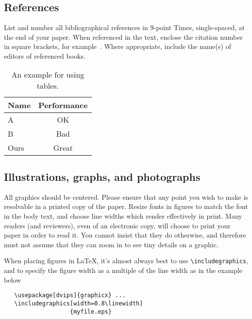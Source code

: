 \documentclass[10pt,twocolumn,letterpaper]{article}
\begin{document}
\subsection{References}

List and number all bibliographical references in 9-point Times,
single-spaced, at the end of your paper. When referenced in the text,
enclose the citation number in square brackets, for
example~\cite{Authors12}.  Where appropriate, include the name(s) of
editors of referenced books.

\begin{table}
\begin{center}
\begin{tabular}{|l|c|}
\hline
Name & Performance \\
\hline\hline
A & OK\\
B & Bad \\
Ours & Great\\
\hline
\end{tabular}
\end{center}
\caption{An example for using tables.}
\end{table}

\subsection{Illustrations, graphs, and photographs}

All graphics should be centered.  Please ensure that any point you wish to
make is resolvable in a printed copy of the paper.  Resize fonts in figures
to match the font in the body text, and choose line widths which render
effectively in print.  Many readers (and reviewers), even of an electronic
copy, will choose to print your paper in order to read it.  You cannot
insist that they do otherwise, and therefore must not assume that they can
zoom in to see tiny details on a graphic.

When placing figures in \LaTeX, it's almost always best to use
\verb+\includegraphics+, and to specify the  figure width as a multiple of
the line width as in the example below
{\small\begin{verbatim}
   \usepackage[dvips]{graphicx} ...
   \includegraphics[width=0.8\linewidth]
                   {myfile.eps}
\end{verbatim}
}



{\small


}
\end{document}

